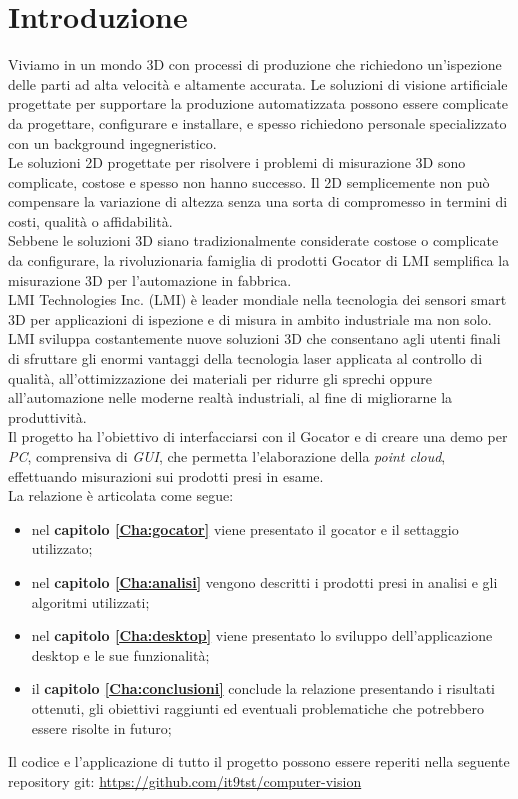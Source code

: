\chapter{Introduzione}
\label{Cha:introduzione}
\thispagestyle{empty}

Viviamo in un mondo 3D con processi di produzione che richiedono un'ispezione delle parti ad alta velocità e altamente accurata. Le soluzioni di visione artificiale progettate per supportare la produzione automatizzata possono essere complicate da progettare, configurare e installare, e spesso richiedono personale specializzato con un background ingegneristico.\\
\newline
Le soluzioni 2D progettate per risolvere i problemi di misurazione 3D sono complicate, costose e spesso non hanno successo. Il 2D semplicemente non può compensare la variazione di altezza senza una sorta di compromesso in termini di costi, qualità o affidabilità.\\
\newline
Sebbene le soluzioni 3D siano tradizionalmente considerate costose o complicate da configurare, la rivoluzionaria famiglia di prodotti Gocator di LMI semplifica la misurazione 3D per l'automazione in fabbrica.\\
\newline
LMI Technologies Inc. (LMI) è leader mondiale nella tecnologia dei sensori smart 3D per applicazioni di ispezione e di misura in ambito industriale ma non solo. LMI sviluppa costantemente nuove soluzioni 3D che consentano agli utenti finali di sfruttare gli enormi vantaggi della tecnologia laser applicata al controllo di qualità, all'ottimizzazione dei materiali per ridurre gli sprechi oppure all'automazione nelle moderne realtà industriali, al fine di migliorarne la produttività.\\
\newline
Il progetto ha l'obiettivo di interfacciarsi con il Gocator e di creare una demo per \textit{PC}, comprensiva di \textit{GUI}, che permetta l'elaborazione della \textit{point cloud}, effettuando misurazioni sui prodotti presi in esame.\\

\noindent La relazione è articolata come segue:
\begin{itemize}
	\item nel \textbf{capitolo \ref{Cha:gocator}} viene presentato il gocator e il settaggio utilizzato;
	\item nel \textbf{capitolo \ref{Cha:analisi}} vengono descritti i prodotti presi in analisi e gli algoritmi utilizzati;
	\item nel \textbf{capitolo \ref{Cha:desktop}} viene presentato lo sviluppo dell'applicazione desktop e le sue funzionalità;
	\item il \textbf{capitolo \ref{Cha:conclusioni}} conclude la relazione presentando i risultati ottenuti, gli obiettivi raggiunti ed eventuali problematiche che potrebbero essere risolte in futuro;
\end{itemize}
Il codice e l'applicazione di tutto il progetto possono essere reperiti nella seguente repository git: \href{https://github.com/it9tst/computer-vision}{https://github.com/it9tst/computer-vision}